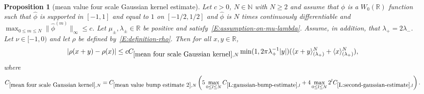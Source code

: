 \documentclass[12pt,reqno]{amsart}
\theoremstyle{plain}
\newtheorem{proposition}[theorem]{Proposition}
\numberwithin{equation}{section}
\theoremstyle{remark}
\newcommand{\uses}[1]{}
\newcommand{\usesdefs}[1]{}
\newcommand{\R}{{\mathbb R}}
\begin{document}
\begin{proposition}[mean value four scale Gaussian kernel estimate]\label{mean four scale Gaussian kernel}\uses{L:gaussian-bump-decomposition,mean value bump estimate 2,L:gaussian-bump-estimate,L:second-gaussian-estimate}\usesdefs{gaussian,bracket bump,auto:Wiener-space-definition}
Let $c>0$, $N\in \mathbb N$ with $N\geq 2$ and assume that $\phi$ is a $W_0(\R)$ function such that
$\widehat{\phi}$ is supported in $[-1,1]$ and equal to $1$ on $[-1/2,1/2]$ and $\widehat{\phi}$ is $N$ times continuously differentiable and $\max_{0\leq m \leq N} \|\widehat{\phi}^{(m)}\|_{\infty} \leq c$.
Let $\mu_\pm,\lambda_\pm\in\mathbb R$ be positive and satisfy~\eqref{E:assumption-on-mu-lambda}. Assume, in addition, that $\lambda_{+}=2\lambda_{-}$.
Let $\nu\in [-1,0)$ and let $\rho$ be defined by~\eqref{E:definition-rho}.
Then for all $x,y \in\mathbb{R}$,
\begin{equation}\label{E:mean-value}
|\rho(x+y)-\rho(x)| \le c C_{\ref{mean four scale Gaussian kernel},N} \min(1,2\pi \lambda_{+}^{-1}|y|) (\langle x+y\rangle^N_{(\lambda_+)}+
\langle x\rangle^N_{(\lambda_+)}),
\end{equation}
where
\begin{equation}\label{auto:mean-four-scale-Gaussian-constant} C_{\ref{mean four scale Gaussian kernel},N} = C_{\ref{mean value bump estimate 2},N}\left(5\max_{0\leq l \leq N} C_{\ref{L:gaussian-bump-estimate},l} +4\max_{0\leq l \leq N} 2^lC_{\ref{L:second-gaussian-estimate},l}\right).\end{equation}


\end{proposition}
\end{document}
